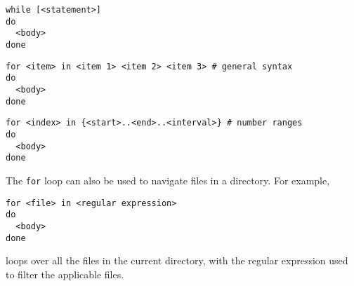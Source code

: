 \begin{lstlisting}
while [<statement>]
do
  <body>
done
\end{lstlisting}

\begin{lstlisting}
for <item> in <item 1> <item 2> <item 3> # general syntax
do
  <body>
done
\end{lstlisting}

\begin{lstlisting}
for <index> in {<start>..<end>..<interval>} # number ranges
do
  <body>
done
\end{lstlisting}

The \verb|for| loop can also be used to navigate files in a directory. For example,
\begin{lstlisting}
for <file> in <regular expression>
do
  <body>
done
\end{lstlisting}
loops over all the files in the current directory, with the regular expression used to filter the applicable files.



















